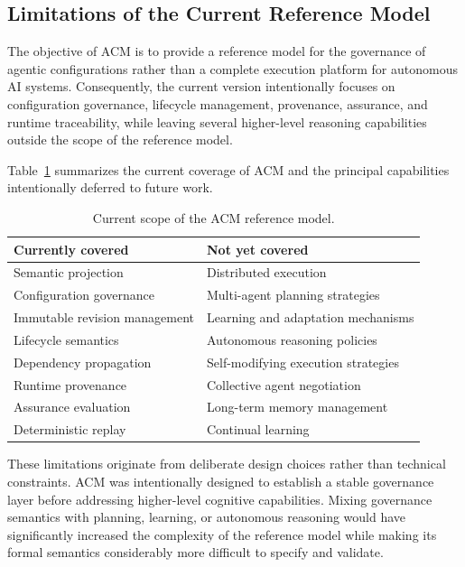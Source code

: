 \documentclass[10pt]{article}
\begin{document}
\subsection{Limitations of the Current Reference Model}
\label{subsec:limitations}

The objective of ACM is to provide a reference model for the governance of
agentic configurations rather than a complete execution platform for autonomous
AI systems. Consequently, the current version intentionally focuses on
configuration governance, lifecycle management, provenance, assurance, and
runtime traceability, while leaving several higher-level reasoning capabilities
outside the scope of the reference model.

Table~\ref{tab:limitations_scope} summarizes the current coverage of ACM and
the principal capabilities intentionally deferred to future work.

\begin{table}[t]
\caption{Current scope of the ACM reference model.}
\label{tab:limitations_scope}
\centering
\begin{tabular}{p{3.1cm}p{3.4cm}}
\hline
\textbf{Currently covered} &
\textbf{Not yet covered} \\
\hline
Semantic projection &
Distributed execution \\
Configuration governance &
Multi-agent planning strategies \\
Immutable revision management &
Learning and adaptation mechanisms \\
Lifecycle semantics &
Autonomous reasoning policies \\
Dependency propagation &
Self-modifying execution strategies \\
Runtime provenance &
Collective agent negotiation \\
Assurance evaluation &
Long-term memory management \\
Deterministic replay &
Continual learning \\
\hline
\end{tabular}
\end{table}

These limitations originate from deliberate design choices rather than
technical constraints. ACM was intentionally designed to establish a stable
governance layer before addressing higher-level cognitive capabilities. Mixing
governance semantics with planning, learning, or autonomous reasoning would
have significantly increased the complexity of the reference model while making
its formal semantics considerably more difficult to specify and validate.
\end{document}
